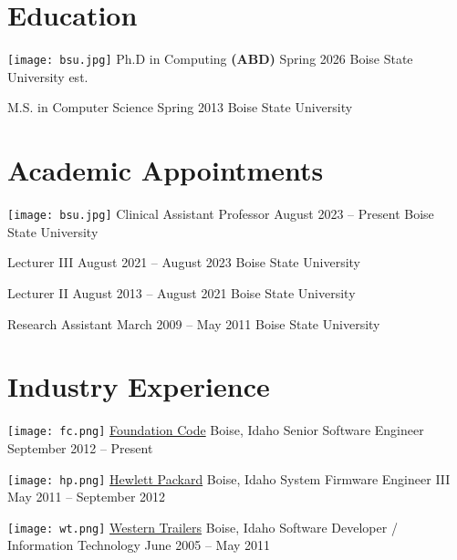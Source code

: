 \documentclass{shanep}
\begin{document}

\section*{Education}
\begin{itemize}
  \ressubheading
      {\texttt{[image: bsu.jpg]}}
      {Ph.D in Computing \textbf{(ABD)}}
      {Spring 2026}
      {Boise State University}
      {est.}

  \ressubheading
      {}
      {M.S. in Computer Science}
      {Spring 2013}
      {Boise State University}
      {}
\end{itemize} %

\section*{Academic Appointments}
\begin{itemize}
  \ressubheading
      {\texttt{[image: bsu.jpg]}}
      {Clinical Assistant Professor}
      {August 2023 -- Present}
      {Boise State University}
      {}

  \ressubheading
      {}
      {Lecturer III}
      {August 2021 -- August 2023}
      {Boise State University}
      {}

  \ressubheading
      {}
      {Lecturer II}
      {August 2013 -- August 2021}
      {Boise State University}
      {}

  \ressubheading
      {}
      {Research Assistant}
      {March 2009 -- May 2011}
      {Boise State University}
      {}

\end{itemize}

\section*{Industry Experience}
\begin{itemize}

  \ressubheading
      {\texttt{[image: fc.png]}}
      {{\href{https://foundationcode.com}{Foundation Code}}}
      {Boise, Idaho}
      {Senior Software Engineer}
      {September 2012 -- Present}

   \ressubheading
       {\texttt{[image: hp.png]}}
       {{\href{https://hp.com}{Hewlett Packard}}}
       {Boise, Idaho}
       {System Firmware Engineer III}
       {May 2011 -- September 2012}

   \ressubheading
       {\texttt{[image: wt.png]}}
       {{\href{http://westerntrailer.com}{Western Trailers}}}
       {Boise, Idaho}
       {Software Developer / Information Technology}
       {June 2005 -- May 2011}

\end{itemize}
\end{document}
